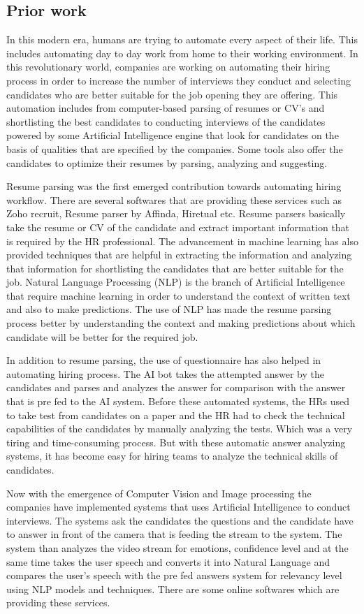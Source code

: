 \subsection{Prior work}
In this modern era, humans are trying to automate every aspect of their life. This includes automating day to day work from home to their working environment. In this revolutionary world, companies are working on automating their hiring process in order to increase the number of interviews they conduct and selecting candidates who are better suitable for the job opening they are offering. This automation includes from computer-based parsing of resumes or CV’s and shortlisting the best candidates to conducting interviews of the candidates powered by some Artificial Intelligence engine that look for candidates on the basis of qualities that are specified by the companies. Some tools also offer the candidates to optimize their resumes by parsing, analyzing and suggesting.\par
Resume parsing\cite{khan2016resume} was the first emerged contribution towards automating hiring workflow. There are several softwares that are providing these services such as Zoho recruit, Resume parser by Affinda, Hiretual etc. Resume parsers basically take the resume or CV of the candidate and extract important information that is required by the HR professional. The advancement in machine learning has also provided techniques that are helpful in extracting the information and analyzing that information for shortlisting the candidates that are better suitable for the job. Natural Language Processing (NLP) is the branch of Artificial Intelligence that require machine learning in order to understand the context of written text and also to make predictions. The use of NLP has made the resume parsing process better by understanding the context and making predictions about which candidate will be better for the required job.\par
In addition to resume parsing, the use of questionnaire has also helped in automating hiring process. The AI bot takes the attempted answer by the candidates and parses and analyzes the answer for comparison with the answer that is pre fed to the AI system. Before these automated systems, the HRs used to take test from candidates on a paper and the HR had to check the technical capabilities of the candidates by manually analyzing the tests. Which was a very tiring and time-consuming process. But with these automatic answer analyzing systems, it has become easy for hiring teams to analyze the technical skills of candidates. \par
Now with the emergence of Computer Vision and Image processing the companies have implemented systems that uses Artificial Intelligence to conduct interviews. The systems ask the candidates the questions and the candidate have to answer in front of the camera that is feeding the stream to the system. The system than analyzes the video stream for emotions, confidence level and at the same time takes the user speech and converts it into Natural Language and compares the user’s speech with the pre fed answers system for relevancy level using NLP models and techniques. There are some online softwares which are providing these services.

